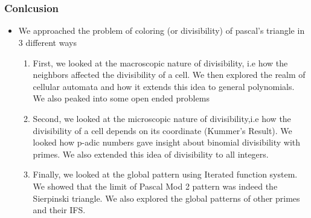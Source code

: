 \documentclass{beamer}
\begin{document}



\section*{}
\begin{frame}
    \frametitle{Conlcusion}
    \begin{itemize}
        \item We approached the problem of coloring (or divisibility) of pascal's triangle in 3 different ways 
        \begin{enumerate}
            \item First, we looked at the macroscopic nature of divisibility, i.e how the neighbors affected the divisibility of a cell. We then explored the realm of cellular automata and how it extends this idea to general polynomials. We also peaked into some open ended problems
            \item Second, we looked at the microscopic nature of divisibility,i.e how the divisibility of a cell depends on its coordinate (Kummer's Result). We looked how p-adic numbers gave insight about binomial divisibility with primes. We also extended this idea of divisibility to all integers.
            \item Finally, we looked at the global pattern using Iterated function system. We showed that the limit of Pascal Mod 2 pattern was indeed the Sierpinski triangle. We also explored the global patterns of other primes and their IFS. 
        \end{enumerate}
    \end{itemize}
\end{frame}
\end{document}
